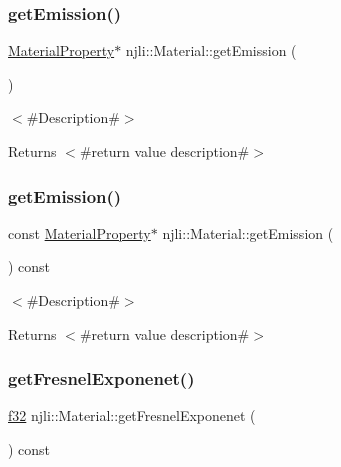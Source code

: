 \subsubsection{\texorpdfstring{get\+Emission()}{getEmission()}\hspace{0.1cm}{\footnotesize\ttfamily [1/2]}}
{\footnotesize\ttfamily \mbox{\hyperlink{classnjli_1_1_material_property}{Material\+Property}}$\ast$ njli\+::\+Material\+::get\+Emission (\begin{DoxyParamCaption}{ }\end{DoxyParamCaption})}

$<$\#\+Description\#$>$

\begin{DoxyReturn}{Returns}
$<$\#return value description\#$>$ 
\end{DoxyReturn}
\mbox{\label{classnjli_1_1_material_accadd4b05460b5d6fff5560bac4d8d05}} 
\subsubsection{\texorpdfstring{get\+Emission()}{getEmission()}\hspace{0.1cm}{\footnotesize\ttfamily [2/2]}}
{\footnotesize\ttfamily const \mbox{\hyperlink{classnjli_1_1_material_property}{Material\+Property}}$\ast$ njli\+::\+Material\+::get\+Emission (\begin{DoxyParamCaption}{ }\end{DoxyParamCaption}) const}

$<$\#\+Description\#$>$

\begin{DoxyReturn}{Returns}
$<$\#return value description\#$>$ 
\end{DoxyReturn}
\mbox{\label{classnjli_1_1_material_a39a624518fbe4e029918ed855adf3aea}} 
\subsubsection{\texorpdfstring{get\+Fresnel\+Exponenet()}{getFresnelExponenet()}}
{\footnotesize\ttfamily \mbox{\hyperlink{_util_8h_a5f6906312a689f27d70e9d086649d3fd}{f32}} njli\+::\+Material\+::get\+Fresnel\+Exponenet (\begin{DoxyParamCaption}{ }\end{DoxyParamCaption}) const}

